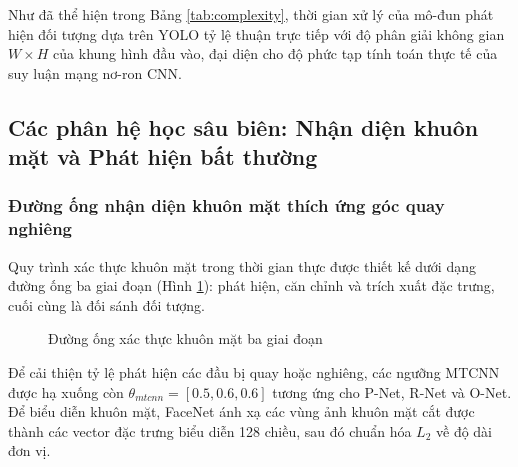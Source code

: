 \documentclass[12pt,a4paper]{article}
\begin{document}
Như đã thể hiện trong Bảng \ref{tab:complexity}, thời gian xử lý của mô-đun phát hiện đối tượng dựa trên YOLO tỷ lệ thuận trực tiếp với độ phân giải không gian $W \times H$ của khung hình đầu vào, đại diện cho độ phức tạp tính toán thực tế của suy luận mạng nơ-ron CNN.


\subsection{Các phân hệ học sâu biên: Nhận diện khuôn mặt và Phát hiện bất thường}

\subsubsection*{Đường ống nhận diện khuôn mặt thích ứng góc quay nghiêng}
Quy trình xác thực khuôn mặt trong thời gian thực được thiết kế dưới dạng đường ống ba giai đoạn (Hình \ref{fig:face_pipeline}): phát hiện, căn chỉnh và trích xuất đặc trưng, cuối cùng là đối sánh đối tượng.

\begin{figure}[h]
    \centering
    \caption{Đường ống xác thực khuôn mặt ba giai đoạn}
    \label{fig:face_pipeline}
\end{figure}

Để cải thiện tỷ lệ phát hiện các đầu bị quay hoặc nghiêng, các ngưỡng MTCNN được hạ xuống còn $\theta_{mtcnn} = [0.5, 0.6, 0.6]$ tương ứng cho P-Net, R-Net và O-Net. Để biểu diễn khuôn mặt, FaceNet ánh xạ các vùng ảnh khuôn mặt cắt được thành các vector đặc trưng biểu diễn 128 chiều, sau đó chuẩn hóa $L_2$ về độ dài đơn vị.
\end{document}

